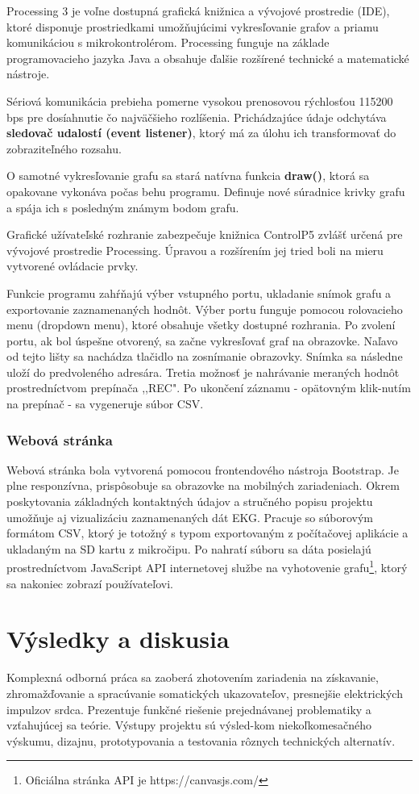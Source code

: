 \documentclass[titlepage,12pt]{article}
\begin{document}
Processing 3 je voľne dostupná grafická knižnica a vývojové prostredie (IDE), ktoré disponuje prostriedkami umožňujúcimi vykresľovanie grafov a priamu komunikáciou s mikrokontrolérom. Processing funguje na základe programovacieho jazyka Java a obsahuje ďalšie rozšírené technické a matematické nástroje. 

Sériová komunikácia prebieha pomerne vysokou prenosovou rýchlosťou 115200 bps pre dosíahnutie čo najväčšieho rozlíšenia. Prichádzajúce údaje odchytáva \textbf{sledovač udalostí (event listener)}, ktorý má za úlohu ich transformovať do zobraziteľného rozsahu.

O samotné vykresľovanie grafu sa stará natívna funkcia \textbf{draw()}, ktorá sa opakovane vykonáva počas behu programu. Definuje nové súradnice krivky grafu a spája ich s posledným známym bodom grafu.

Grafické užívateľské rozhranie zabezpečuje knižnica ControlP5 zvlášť určená pre vývojové prostredie Processing. Úpravou a rozšírením jej tried boli na mieru vytvorené ovládacie prvky.  

Funkcie programu zahŕňajú výber vstupného portu, ukladanie snímok grafu a exportovanie zaznamenaných hodnôt. Výber portu funguje pomocou rolovacieho menu (dropdown menu), ktoré obsahuje všetky dostupné rozhrania. Po zvolení portu, ak bol úspešne otvorený, sa začne vykresľovať graf na obrazovke. Naľavo od tejto lišty sa nachádza tlačidlo na zosnímanie obrazovky. Snímka sa následne uloží do predvoleného adresára. Tretia možnosť je nahrávanie meraných hodnôt prostredníctvom prepínača ,,REC". Po ukončení záznamu - opätovným klik-nutím na prepínač - sa vygeneruje súbor CSV.

\subsubsection{Webová stránka}
Webová stránka bola vytvorená pomocou frontendového nástroja Bootstrap. Je plne responzívna, prispôsobuje sa obrazovke na mobilných zariadeniach. Okrem poskytovania základných kontaktných údajov a stručného popisu projektu umožňuje aj vizualizáciu zaznamenaných dát EKG. Pracuje so súborovým formátom CSV, ktorý je totožný s typom exportovaným z počítačovej aplikácie a ukladaným na SD kartu z mikročipu. Po nahratí súboru sa dáta posielajú prostredníctvom JavaScript API internetovej službe na vyhotovenie grafu\footnote{Oficiálna stránka API je https://canvasjs.com/}, ktorý sa nakoniec zobrazí používateľovi. 


\newpage
\section{Výsledky a diskusia}
Komplexná odborná práca sa zaoberá zhotovením zariadenia na získavanie, zhromažďovanie a spracúvanie somatických ukazovateľov, presnejšie elektrických impulzov srdca. Prezentuje funkčné riešenie prejednávanej problematiky a vzťahujúcej sa teórie. Výstupy projektu sú výsled-kom niekoľkomesačného výskumu, dizajnu, prototypovania a testovania rôznych technických alternatív.
\end{document}
